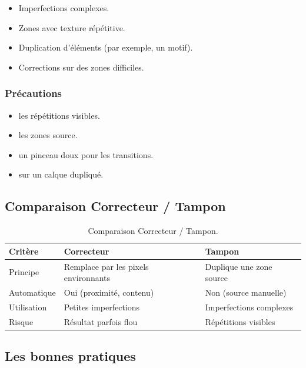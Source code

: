 \begin{itemize}
    \item Imperfections complexes.
    \item Zones avec texture répétitive.
    \item Duplication d'éléments (par exemple, un motif).
    \item Corrections sur des zones difficiles.
\end{itemize}

\subsubsection{Précautions}

\begin{itemize}
    \item {} les répétitions visibles.
    \item {} les zones source.
    \item {} un pinceau doux pour les transitions.
    \item {} sur un calque dupliqué.
\end{itemize}

\subsection{Comparaison Correcteur / Tampon}

\begin{table}[h!]
\centering
\begin{tabular}{@{}p{3.5cm}p{5cm}p{5cm}@{}}
\toprule
\textbf{Critère} & \textbf{Correcteur} & \textbf{Tampon} \\
\midrule
Principe & Remplace par les pixels environnants & Duplique une zone source \\
Automatique & Oui (proximité, contenu) & Non (source manuelle) \\
Utilisation & Petites imperfections & Imperfections complexes \\
Risque & Résultat parfois flou & Répétitions visibles \\
\bottomrule
\end{tabular}
\caption{Comparaison Correcteur / Tampon.}
\end{table}

\subsection{Les bonnes pratiques}

